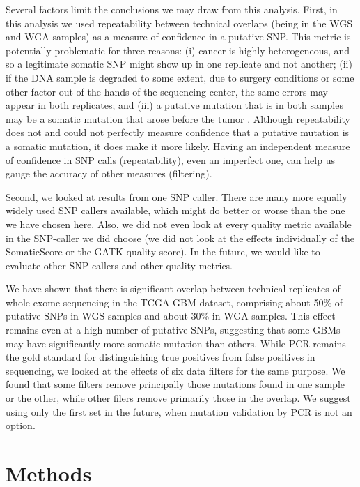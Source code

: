 \documentclass[11pt]{article} %
\begin{document}
Several factors limit the conclusions we may draw from this analysis. First, in this analysis we used repeatability between technical overlaps (being in the WGS and WGA samples) as a measure of confidence in a putative SNP. This metric is potentially problematic for three reasons: (i) cancer is highly heterogeneous, and so a legitimate somatic SNP might show up in one replicate and not another; (ii) if the DNA sample is degraded to some extent, due to surgery conditions or some other factor out of the hands of the sequencing center, the same errors may appear in both replicates; and (iii) a putative mutation that is in both samples may be a somatic mutation that arose before the tumor \citep{pre-tumor-muts}. Although repeatability does not and could not perfectly measure confidence that a putative mutation is a somatic mutation, it does make it more likely. Having an independent measure of confidence in SNP calls (repeatability), even an imperfect one, can help us gauge the accuracy of other measures (filtering). 

Second, we looked at results from one SNP caller. There are many more equally widely used SNP callers available, which might do better or worse than the one we have chosen here. Also, we did not even look at every quality metric available in the SNP-caller we did choose (we did not look at the effects individually of the SomaticScore or the GATK quality score). In the future, we would like to evaluate other SNP-callers and other quality metrics.

We have shown that there is significant overlap between technical replicates of whole exome sequencing in the TCGA GBM dataset, comprising about 50\% of putative SNPs in WGS samples and about 30\% in WGA samples. This effect remains even at a high number of putative SNPs, suggesting that some GBMs may have significantly more somatic mutation than others. While PCR remains the gold standard for distinguishing true positives from false positives in sequencing, we looked at the effects of six data filters for the same purpose. We found that some filters remove principally those mutations found in one sample or the other, while other filers remove primarily those in the overlap. We suggest using only the first set in the future, when mutation validation by PCR is not an option.

\section*{Methods}
\end{document}
